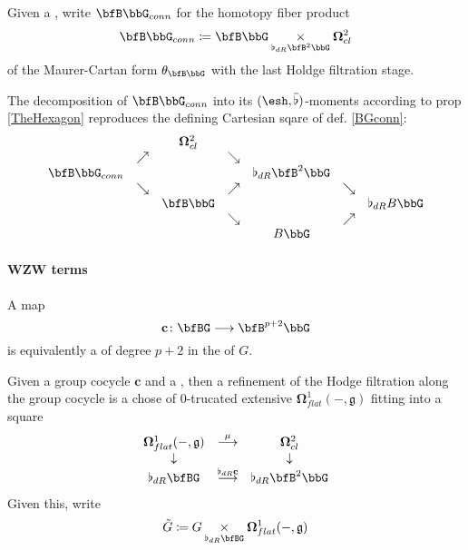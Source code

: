 \begin{defn}
\label{BGconn}\hypertarget{BGconn}{}
Given a , write $\bfB\bbG_{conn}$ for the homotopy fiber product
\begin{displaymath}
\bfB\bbG_{conn}
\coloneqq
\bfB\bbG\underset{\flat_{dR}\bfB^2\bbG}{\times} \mathbf{\Omega}^2_{cl}
\end{displaymath}
of the Maurer-Cartan form $\theta_{\bfB\bbG}$ with the last Holdge filtration stage.
\end{defn}
\begin{prop}
\label{}\hypertarget{}{}
The decomposition of $\bfB\bbG_{conn}$ into its $(\esh , \overline{\flat})$-moments according to prop \ref{TheHexagon} reproduces the defining Cartesian sqare of def. \ref{BGconn}:
\begin{displaymath}
\itexarray{
&& \mathbf{\Omega}^2_{cl}
\\
& \nearrow && \searrow
\\
\bfB\bbG_{conn}
&& &&
\flat_{dR}\bfB^2\bbG
\\
& \searrow && \nearrow && \searrow
\\
&& \bfB\bbG && &&  \flat_{dR}B \bbG
\\
&& & \searrow && \nearrow
\\
&& && B \bbG
}
\end{displaymath}
\end{prop}
\hypertarget{WZWTerms}{}\paragraph*{{WZW terms}}\label{WZWTerms}
A map
\begin{displaymath}
\mathbf{c} \colon \bfBG \longrightarrow \bfB^{p+2} \bbG
\end{displaymath}
is equivalently a  of degree $p+2$ in the  of $G$.
\begin{defn}
\label{FormRefinementOfCocycle}\hypertarget{FormRefinementOfCocycle}{}
Given a group cocycle $\mathbf{c}$ and a , then a refinement of the Hodge filtration along the group cocycle is a chose of 0-trucated extensive $\mathbf{\Omega}^1_{flat}(-,\mathfrak{g})$ fitting into a square
\begin{displaymath}
\itexarray{
\mathbf{\Omega}^1_{flat}(-,\mathfrak{g})
&\stackrel{\mu}{\longrightarrow}&
\mathbf{\Omega}^2_{cl}
\\
\downarrow && \downarrow
\\
\flat_{dR} \bfBG
&\stackrel{\flat_{dR}\mathbf{c}}{\longrightarrow}&
\flat_{dR} \bfB^2 \bbG
}
\end{displaymath}
Given this, write
\begin{displaymath}
\tilde G
\coloneqq G \underset{\flat_{dR}\bfBG}{\times} \mathbf{\Omega}^1_{flat}(-,\mathfrak{g})
\end{displaymath}
\end{defn}
